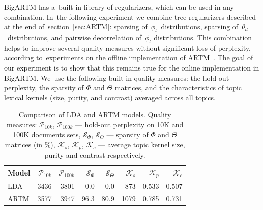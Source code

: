 \documentclass{sig-alternate}
\begin{document}
BigARTM has a~built-in library of regularizers, which can be used in any combination.
In~the following experiment we combine tree regularizers described at the end of~section~\ref{sec:ARTM}:
sparsing of~$\phi_{t}$~distributions,
sparsing of~$\theta_{d}$~distributions, and
pairwise decorrelation of~$\phi_{t}$ distributions.
This combination helps to improve several quality measures without significant loss of perplexity,
according to~experiments on the offline implementation of ARTM~\cite{voron14aist}.
The goal of our experiment is to show that this remains true
for the online implementation in BigARTM.
We~use the following built-in quality measures:
the hold-out perplexity,
the sparsity of $\Phi$ and $\Theta$ matrices, and
the characteristics of topic lexical kernels (size, purity, and contrast) averaged across all topics.

\begin{table}[t]
    \caption{Comparison of LDA and ARTM models.
        Quality measures:
        $\mathcal{P}_{10k}$, $\mathcal{P}_{100k}$ --- hold-out perplexity on 10K and 100K documents sets,
        $\mathcal{S}_{\Phi}$, $\mathcal{S}_{\Theta}$ --- sparsity of $\Phi$ and $\Theta$ matrices (in \%),
        $\mathcal{K}_{s}$, $\mathcal{K}_{p}$, $\mathcal{K}_{c}$ --- average topic kernel size, purity and contrast respectively.}
    \label{tab:model_comparison}
    \centering\tabcolsep=4.6pt
    \begin{tabular}[t]{l|rrrrrrr}
    \hline
    Model & $\mathcal{P}_{10k}$ & $\mathcal{P}_{100k}$ &  $\mathcal{S}_{\Phi}$ & $\mathcal{S}_{\Theta}$ &  $\mathcal{K}_{s}$ & $\mathcal{K}_{p}$ &  $\mathcal{K}_{c}$ \\
    \hline
        LDA    & 3436 & 3801 & 0.0  & 0.0  & 873  & 0.533 & 0.507 \\
        ARTM   & 3577 & 3947 & 96.3 & 80.9 & 1079 & 0.785 & 0.731 \\
    \hline

    \end{tabular}
\end{table}
\end{document}
